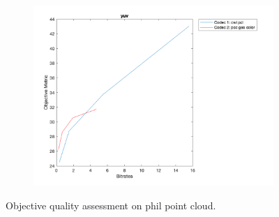 \documentclass{article}
\begin{document}
\begin{figure}
    \begin{subfigure}[b]{0.65\textwidth}
    \includegraphics[width=\textwidth]{Figures/task2/phil_yuv.png}
    \end{subfigure}
    \caption{Objective quality assessment on \textsf{phil} point cloud.}
    \label{fig:obj_phil}
\end{figure}
\end{document}
